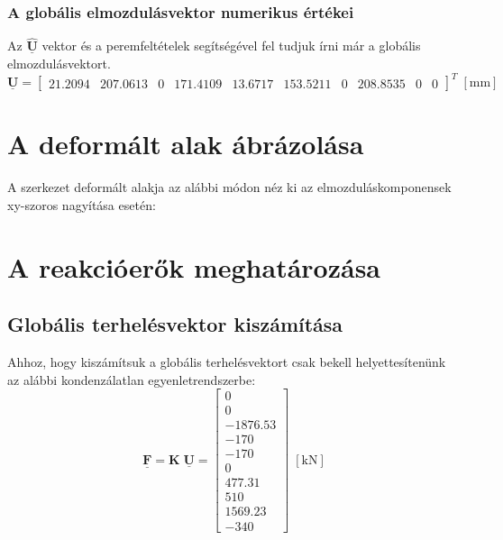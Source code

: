 \documentclass[12pt,a4paper]{article}
\def\mx#1{\mathbf{#1}}
\def\vec#1{\underline{\mathbf{#1}}}
\def\mili{\; \left[\mathrm{mm}\right]}
\def\kN{\; \left[\mathrm{kN}\right]}
\begin{document}
\subsubsection{A globális elmozdulásvektor numerikus értékei}
Az $\vec{\hat{U}}$ vektor és a peremfeltételek segítségével fel tudjuk írni már
a globális elmozdulásvektort.
\begin{equation}
    \vec{U}=
    \begin{bmatrix}
        21.2094  &
        207.0613 &
        0        &
        171.4109 &
        13.6717  &
        153.5211 &
        0        &
        208.8535 &
        0        &
        0
    \end{bmatrix}^{T} \mili
\end{equation}
\section{A deformált alak ábrázolása}
A szerkezet deformált alakja az alábbi módon néz ki az elmozduláskomponensek xy-szoros
nagyítása esetén:

\section{A reakcióerők meghatározása}
\subsection{Globális terhelésvektor kiszámítása}
Ahhoz, hogy kiszámítsuk a globális terhelésvektort csak bekell helyettesítenünk
az alábbi kondenzálatlan egyenletrendszerbe:
\begin{equation}
    \vec{F}=\mx{K} \; \vec{U}=
    \begin{bmatrix}
        0        \\
        0        \\
        -1876.53 \\
        -170     \\
        -170     \\
        0        \\
        477.31   \\
        510      \\
        1569.23  \\
        -340
    \end{bmatrix} \kN
\end{equation}
\end{document}
